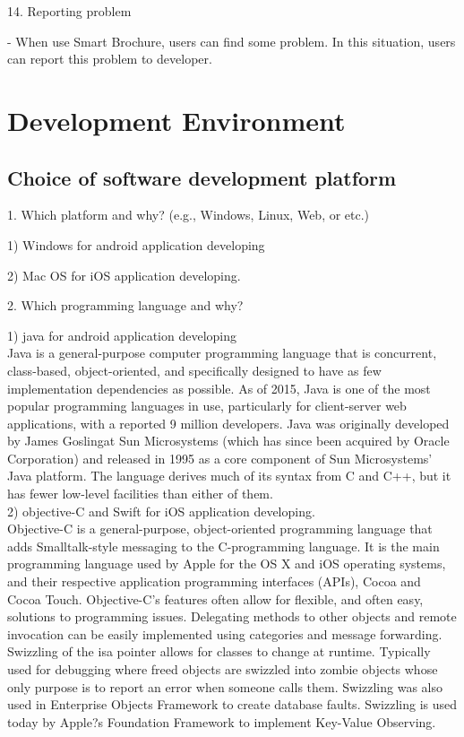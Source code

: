 \documentclass[conference]{IEEEtran}
\begin{document}
14. Reporting problem

\quad - When use Smart Brochure, users can find some problem. In this situation, users can report this problem to developer.


\section{Development Environment}

\subsection{Choice of software development platform}
1. Which platform and why? (e.g., Windows, Linux, Web, or etc.) 

1) Windows for android application developing

2) Mac OS for iOS application developing.

2. Which programming language and why?

1) java for android application developing \\

Java is a general-purpose computer programming language that is concurrent, class-based, object-oriented, and specifically designed to have as few implementation dependencies as possible. As of 2015, Java is one of the most popular programming languages in use, particularly for client-server web applications, with a reported 9 million developers. Java was originally developed by James Goslingat Sun Microsystems (which has since been acquired by Oracle Corporation) and released in 1995 as a core component of Sun Microsystems' Java platform. The language derives much of its syntax from C and C++, but it has fewer low-level facilities than either of them.\\


2) objective-C and Swift for iOS application developing.\\
 Objective-C is a general-purpose, object-oriented programming language that adds Smalltalk-style messaging to the C-programming language. It is the main programming language used by Apple for the OS X and iOS operating systems, and their respective application programming interfaces (APIs), Cocoa and Cocoa Touch.
Objective-C's features often allow for flexible, and often easy, solutions to programming issues. Delegating methods to other objects and remote invocation can be easily implemented using categories and message forwarding. Swizzling of the isa pointer allows for classes to change at runtime. Typically used for debugging where freed objects are swizzled into zombie objects whose only purpose is to report an error when someone calls them. Swizzling was also used in Enterprise Objects Framework to create database faults. Swizzling is used today by Apple?s Foundation Framework to implement Key-Value Observing.\\
\end{document}
